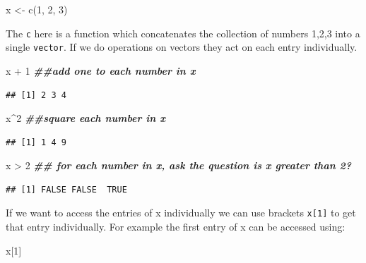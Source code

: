 \documentclass[
]{book}
\newenvironment{Shaded}{\begin{snugshade}}{\end{snugshade}}
\newcommand{\DecValTok}[1]{\textcolor[rgb]{0.00,0.00,0.81}{#1}}
\newcommand{\DocumentationTok}[1]{\textcolor[rgb]{0.56,0.35,0.01}{\textbf{\textit{#1}}}}
\newcommand{\FunctionTok}[1]{\textcolor[rgb]{0.00,0.00,0.00}{#1}}
\newcommand{\NormalTok}[1]{#1}
\newcommand{\OtherTok}[1]{\textcolor[rgb]{0.56,0.35,0.01}{#1}}
\newcommand{\SpecialCharTok}[1]{\textcolor[rgb]{0.00,0.00,0.00}{#1}}
\theoremstyle{definition}
\theoremstyle{definition}
\theoremstyle{definition}
\theoremstyle{definition}
\theoremstyle{remark}
\begin{document}
\begin{Shaded}
\begin{Highlighting}[]
\NormalTok{x }\OtherTok{\textless{}{-}} \FunctionTok{c}\NormalTok{(}\DecValTok{1}\NormalTok{, }\DecValTok{2}\NormalTok{, }\DecValTok{3}\NormalTok{)}
\end{Highlighting}
\end{Shaded}

The \texttt{c} here is a function which concatenates the collection of numbers 1,2,3 into a single \texttt{vector}. If we do operations on vectors they act on each entry individually.

\begin{Shaded}
\begin{Highlighting}[]
\NormalTok{x }\SpecialCharTok{+} \DecValTok{1}  \DocumentationTok{\#\#add one to each number in x}
\end{Highlighting}
\end{Shaded}

\begin{verbatim}
## [1] 2 3 4
\end{verbatim}

\begin{Shaded}
\begin{Highlighting}[]
\NormalTok{x}\SpecialCharTok{\^{}}\DecValTok{2}  \DocumentationTok{\#\#square each number in x}
\end{Highlighting}
\end{Shaded}

\begin{verbatim}
## [1] 1 4 9
\end{verbatim}

\begin{Shaded}
\begin{Highlighting}[]
\NormalTok{x }\SpecialCharTok{\textgreater{}} \DecValTok{2}  \DocumentationTok{\#\# for each number in x, ask the question is x greater than 2? }
\end{Highlighting}
\end{Shaded}

\begin{verbatim}
## [1] FALSE FALSE  TRUE
\end{verbatim}

If we want to access the entries of x individually we can use brackets \texttt{x{[}1{]}} to get that entry individually. For example the first entry of x can be accessed using:

\begin{Shaded}
\begin{Highlighting}[]
\NormalTok{x[}\DecValTok{1}\NormalTok{]}
\end{Highlighting}
\end{Shaded}
\end{document}

